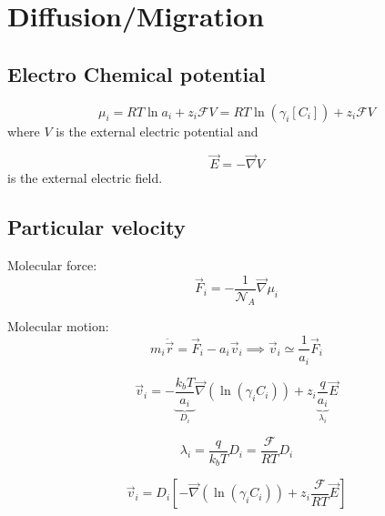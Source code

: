 \documentclass[aps,12pt]{revtex4}
\begin{document}
\section{Diffusion/Migration}

\subsection{Electro Chemical potential}

\begin{equation}
	\mu_i = RT \ln a_i + z_i \mathcal{F} V = RT \ln (\gamma_i[C_i]) + z_i \mathcal{F} V
\end{equation}
where $V$ is the external electric potential and

\begin{equation}
	\vec{E} = -\vec{\nabla} V
\end{equation}
is the external electric field.

\subsection{Particular velocity}
Molecular force:	
\begin{equation}
	\vec{F}_i = - \frac{1}{\mathcal{N}_A} \vec{\nabla} \mu_i
\end{equation}

Molecular motion:
\begin{equation}
	m_i \ddot {\vec{r}} = \vec{F}_i - a_i \vec{v}_i \implies \vec{v}_i \simeq \dfrac{1}{a_i} \vec{F}_i
\end{equation}

\begin{equation}
	\vec{v}_i = -\underbrace{\dfrac{k_bT}{a_i}}_{D_i} \vec{\nabla}(\ln(\gamma_i C_i))  + z_i \underbrace{\dfrac{ q}{a_i}}_{\lambda_i} \vec{E}
\end{equation}

\begin{equation}
	\lambda_i = \frac{q}{k_bT} D_i = \dfrac{\mathcal{F}}{RT} D_i
\end{equation}

\begin{equation}
\boxed{
	\vec{v}_i = D_i \left[ - \vec{\nabla}(\ln(\gamma_i C_i)) + z_i \dfrac{\mathcal{F}}{RT} \vec{E} \right]
}
\end{equation}
\end{document}
